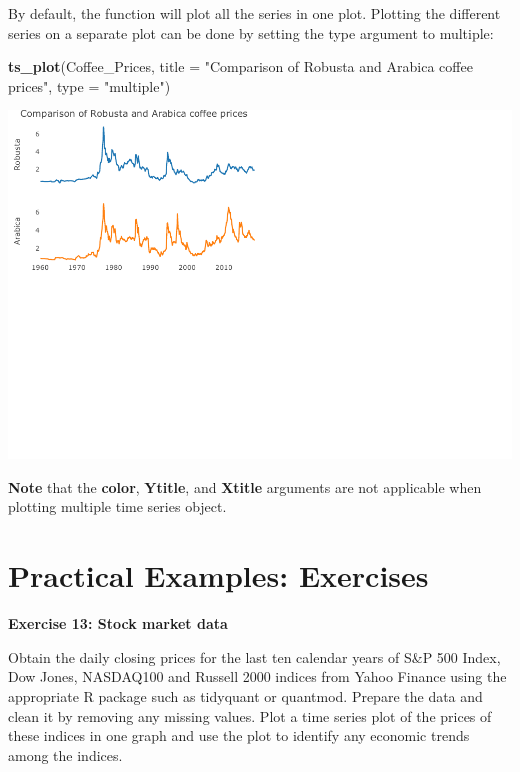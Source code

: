 \documentclass[
]{book}
\newenvironment{Shaded}{\begin{snugshade}}{\end{snugshade}}
\newcommand{\AttributeTok}[1]{\textcolor[rgb]{0.13,0.29,0.53}{#1}}
\newcommand{\FunctionTok}[1]{\textcolor[rgb]{0.13,0.29,0.53}{\textbf{#1}}}
\newcommand{\NormalTok}[1]{#1}
\newcommand{\StringTok}[1]{\textcolor[rgb]{0.31,0.60,0.02}{#1}}
\begin{document}
By default, the function will plot all the series in one plot. Plotting the different series on a separate plot can be done by setting the type argument to multiple:

\begin{Shaded}
\begin{Highlighting}[]
\FunctionTok{ts\_plot}\NormalTok{(Coffee\_Prices,}
        \AttributeTok{title =} \StringTok{"Comparison of Robusta and Arabica coffee prices"}\NormalTok{,}
        \AttributeTok{type =} \StringTok{"multiple"}\NormalTok{)}
\end{Highlighting}
\end{Shaded}

\includegraphics{_main_files/figure-latex/unnamed-chunk-65-1.pdf}

\textbf{Note} that the \textbf{color}, \textbf{Ytitle}, and \textbf{Xtitle} arguments are not applicable when plotting multiple time series object.

\section{Practical Examples: Exercises}\label{practical-examples-exercises-2}

\textbf{Exercise 13: Stock market data}

Obtain the daily closing prices for the last ten calendar years of S\&P 500 Index, Dow Jones, NASDAQ100 and Russell 2000 indices from Yahoo Finance using the appropriate R package such as tidyquant or quantmod. Prepare the data and clean it by removing any missing values. Plot a time series plot of the prices of these indices in one graph and use the plot to identify any economic trends among the indices.
\end{document}
